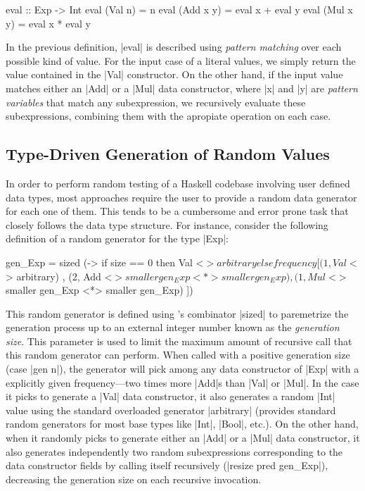 \begin{code}
eval :: Exp -> Int
eval (Val n)    = n
eval (Add x y)  = eval x  +  eval y
eval (Mul x y)  = eval x  *  eval y
\end{code}

In the previous definition, |eval| is described using \emph{pattern matching}
over each possible kind of value.
%
For the input case of a literal values, we simply return the value contained in
the |Val| constructor.
%
On the other hand, if the input value matches either an |Add| or a |Mul| data
constructor, where |x| and |y| are \emph{pattern variables} that match any
subexpression, we recursively evaluate these subexpressions, combining them with
the apropiate operation on each case.

\subsection{\textbf{Type-Driven Generation of Random Values}}

In order to perform random testing of a Haskell codebase involving user defined
data types, most approaches require the user to provide a random data generator
for each one of them.
%
This tends to be a cumbersome and error prone task that closely follows the data
type structure.
%
For instance, consider the following definition of a \quickcheck random
generator for the type |Exp|:

\begin{code}
gen_Exp = sized (\size ->
   if size == 0
   then Val <$> arbitrary
   else frequency
     [  (1, Val  <$> arbitrary)
     ,  (2, Add  <$> smaller gen_Exp <*> smaller gen_Exp)
     ,  (1, Mul  <$> smaller gen_Exp <*> smaller gen_Exp) ])
\end{code} %

This random generator is defined using \quickcheck's combinator |sized| to
paremetrize the generation process up to an external integer number known as the
\emph{generation size}.
%
This parameter is used to limit the maximum amount of recursive call that this
random generator can perform.
%
When called with a positive generation size (case |gen n|), the generator will
pick among any data constructor of |Exp| with a explicitly given frequency---two
times more |Add|s than |Val| or |Mul|.
%
In the case it picks to generate a |Val| data constructor, it also generates a
random |Int| value using the standard overloaded generator |arbitrary|
(\quickcheck provides standard random generators for most base types like |Int|,
|Bool|, etc.).
%
On the other hand, when it randomly picks to generate either an |Add| or a |Mul|
data constructor, it also generates independently two random subexpressions
corresponding to the data constructor fields by calling itself recursively
(|resize pred gen_Exp|), decreasing the generation size on each recursive
invocation.


